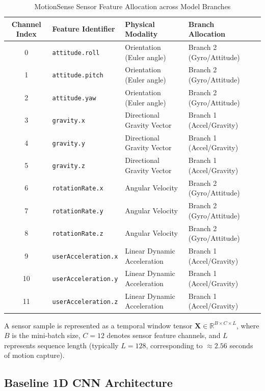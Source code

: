 \begin{table}[htbp]
\centering
\caption{MotionSense Sensor Feature Allocation across Model Branches}
\label{tab:feature_channels}
\small
\begin{tabular}{cllll}
\toprule
\textbf{Channel Index} & \textbf{Feature Identifier} & \textbf{Physical Modality} & \textbf{Branch Allocation} \\
\midrule
0 & \texttt{attitude.roll}       & Orientation (Euler angle)    & Branch 2 (Gyro/Attitude) \\
1 & \texttt{attitude.pitch}      & Orientation (Euler angle)    & Branch 2 (Gyro/Attitude) \\
2 & \texttt{attitude.yaw}        & Orientation (Euler angle)    & Branch 2 (Gyro/Attitude) \\
3 & \texttt{gravity.x}           & Directional Gravity Vector   & Branch 1 (Accel/Gravity) \\
4 & \texttt{gravity.y}           & Directional Gravity Vector   & Branch 1 (Accel/Gravity) \\
5 & \texttt{gravity.z}           & Directional Gravity Vector   & Branch 1 (Accel/Gravity) \\
6 & \texttt{rotationRate.x}      & Angular Velocity             & Branch 2 (Gyro/Attitude) \\
7 & \texttt{rotationRate.y}      & Angular Velocity             & Branch 2 (Gyro/Attitude) \\
8 & \texttt{rotationRate.z}      & Angular Velocity             & Branch 2 (Gyro/Attitude) \\
9 & \texttt{userAcceleration.x}  & Linear Dynamic Acceleration  & Branch 1 (Accel/Gravity) \\
10 & \texttt{userAcceleration.y} & Linear Dynamic Acceleration  & Branch 1 (Accel/Gravity) \\
11 & \texttt{userAcceleration.z} & Linear Dynamic Acceleration  & Branch 1 (Accel/Gravity) \\
\bottomrule
\end{tabular}
\end{table}

A sensor sample is represented as a temporal window tensor $\mathbf{X} \in \mathbb{R}^{B \times C \times L}$, where $B$ is the mini-batch size, $C = 12$ denotes sensor feature channels, and $L$ represents sequence length (typically $L=128$, corresponding to $\approx 2.56$ seconds of motion capture).

\subsection{Baseline 1D CNN Architecture}
\label{subsec:baseline_architecture}

